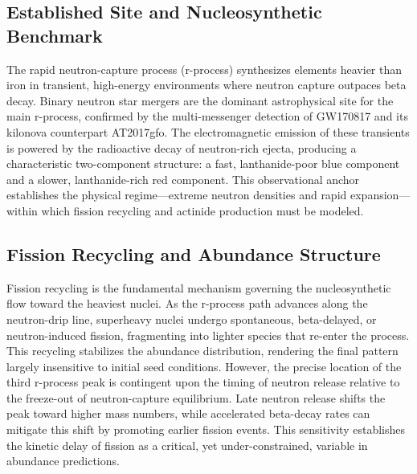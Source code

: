 \documentclass[conference]{IEEEtran}
\begin{document}
\subsection{Established Site and Nucleosynthetic Benchmark}
The rapid neutron-capture process (r-process) synthesizes elements heavier than iron in transient, high-energy environments where neutron capture outpaces beta decay. Binary neutron star mergers are the dominant astrophysical site for the main r-process, confirmed by the multi-messenger detection of GW170817 and its kilonova counterpart AT2017gfo. The electromagnetic emission of these transients is powered by the radioactive decay of neutron-rich ejecta, producing a characteristic two-component structure: a fast, lanthanide-poor blue component and a slower, lanthanide-rich red component. This observational anchor establishes the physical regime---extreme neutron densities and rapid expansion---within which fission recycling and actinide production must be modeled.~\cite{cite_07d6df5d6978a1fc,cite_30c88fe46f23448d,cite_612290131318c0d4}

\subsection{Fission Recycling and Abundance Structure}
Fission recycling is the fundamental mechanism governing the nucleosynthetic flow toward the heaviest nuclei. As the r-process path advances along the neutron-drip line, superheavy nuclei undergo spontaneous, beta-delayed, or neutron-induced fission, fragmenting into lighter species that re-enter the process. This recycling stabilizes the abundance distribution, rendering the final pattern largely insensitive to initial seed conditions. However, the precise location of the third r-process peak is contingent upon the timing of neutron release relative to the freeze-out of neutron-capture equilibrium. Late neutron release shifts the peak toward higher mass numbers, while accelerated beta-decay rates can mitigate this shift by promoting earlier fission events. This sensitivity establishes the kinetic delay of fission as a critical, yet under-constrained, variable in abundance predictions.~\cite{cite_b668987a568d271f,cite_fc6f024383b8a4d2}
\end{document}
